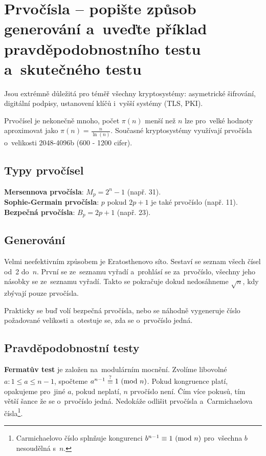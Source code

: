 \section{Prvočísla -- popište způsob generování a~uveďte příklad pravděpodobnostního testu a~skutečného testu}

Jsou extrémně důležitá pro téměř všechny kryptosystémy: asymetrické šifrování, digitální podpisy, ustanovení klíčů i~vyšší systémy (TLS, PKI).

Prvočísel je nekonečně mnoho, počet $\pi(n)$ menší než $n$ lze pro~velké hodnoty aproximovat jako $\pi(n) = \frac{n}{\ln(n)}$. Současné kryptosystémy využívají prvočísla o~velikosti 2048-4096b (600 - 1200 cifer).

\subsection{Typy prvočísel}

\textbf{Mersennova prvočísla}: $M_p = 2^n - 1$ (např. 31). \\
\textbf{Sophie-Germain prvočísla}: $p$ pokud $2p + 1$ je také prvočíslo (např. 11). \\
\textbf{Bezpečná prvočísla}: $B_p = 2p + 1$ (např. 23).

\subsection{Generování}

Velmi neefektivním způsobem je Eratosthenovo síto. Sestaví se seznam všech čísel od~2 do~$n$. První se ze~seznamu vyřadí a~prohlásí se za~prvočíslo, všechny jeho násobky se ze~seznamu vyřadí. Takto se pokračuje dokud nedosáhneme $\sqrt{n}$, kdy zbývají pouze prvočísla.

Prakticky se buď volí bezpečná prvočísla, nebo se náhodně vygeneruje číslo požadované velikosti a~otestuje se, zda se o~prvočíslo jedná.

\subsection{Pravděpodobnostní testy}

\textbf{Fermatův test} je založen na~modulárním mocnění. Zvolíme libovolné $a: 1 \leq a \leq n-1$, spočteme $a^{n-1} \stackrel{?}{\equiv} 1 \ (\mathrm{mod}\ n)$. Pokud kongruence platí, opakujeme pro~jiné $a$, pokud neplatí, $n$ prvočíslo není. Čím více pokusů, tím větší šance že se o~prvočíslo jedná. Nedokáže odlišit prvočísla a~Carmichaelova čísla\footnote{%
Carmichaelovo číslo splnňuje kongurenci $b^{n-1} \equiv 1 \ (\mathrm{mod}\ n)$ pro~všechna $b$ nesoudělná s~$n$.
}.


